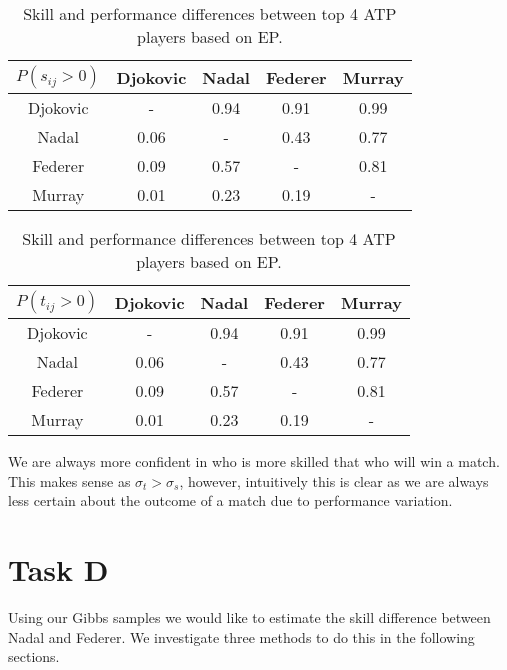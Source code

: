 \documentclass[11pt]{article}
\begin{document}
\begin{table}
    \centering
    \small
    \begin{minipage}{0.45\textwidth}
        \centering
        \begin{tabular}{|c|c c c c|}
            \hline
            $P(s_{ij}>0)$ & Djokovic & Nadal & Federer & Murray \\
            \hline
            Djokovic & -    & 0.94 & 0.91 & 0.99 \\
            Nadal    & 0.06 & -    & 0.43 & 0.77 \\
            Federer  & 0.09 & 0.57 & -    & 0.81 \\
            Murray   & 0.01 & 0.23 & 0.19 & -    \\
            \hline
        \end{tabular}
        \label{tbl:B_skill_difference}
    \end{minipage}
    \begin{minipage}{0.45\textwidth}
        \centering
        \begin{tabular}{|c|c c c c|}
            \hline
            $P(t_{ij}>0)$ & Djokovic & Nadal & Federer & Murray \\
            \hline
            Djokovic & -    & 0.94 & 0.91 & 0.99 \\
            Nadal    & 0.06 & -    & 0.43 & 0.77 \\
            Federer  & 0.09 & 0.57 & -    & 0.81 \\
            Murray   & 0.01 & 0.23 & 0.19 & -    \\
            \hline
        \end{tabular}
        \label{tbl:B_performance_difference}
    \end{minipage}
    \caption{Skill and performance differences between top 4 ATP players based on EP.}
    \label{tbl:B_atp_probabilities}
\end{table}

We are always more confident in who is more skilled that who will win a match. This makes sense as $\sigma_t > \sigma_s$, however, intuitively this is clear as we are always less certain about the outcome of a match due to performance variation.

\section{Task D}
Using our Gibbs samples we would like to estimate the skill difference between Nadal and Federer. We investigate three methods to do this in the following sections.
\end{document}
